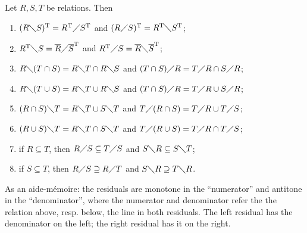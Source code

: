 \begin{lemma} \label{residuals}
Let $R,S,T$ be relations. Then
\begin{enumerate}
\item $(R\diagdown S)^{\mathrm{T}} = R^{\mathrm{T}}\diagup S^{\mathrm{T}}$ and $(R\diagup S)^{\mathrm{T}} = R^{\mathrm{T}}\diagdown S^{\mathrm{T}}$;
\item $R^{\mathrm{T}}\diagdown S = \overline{R}\diagup \overline{S}^{\mathrm{T}}$ and $R^{\mathrm{T}}\diagup S = \overline{R}\diagdown \overline{S}^{\mathrm{T}}$;
\item $R \diagdown (T\cap S) = R\diagdown T \cap R\diagdown S$ and $(T\cap S)\diagup R = T\diagup R \cap S\diagup R$;
\item $R \diagdown (T\cup S) = R\diagdown T \cup R\diagdown S$ and $(T\cap S)\diagup R = T\diagup R \cup S\diagup R$;
\item $(R\cap S) \diagdown T = R\diagdown T \cup S\diagdown T$ and $T\diagup (R\cap S) = T\diagup R \cup T\diagup S$;
\item $(R\cup S) \diagdown T = R\diagdown T \cap S\diagdown T$ and $T\diagup (R\cup S) = T\diagup R \cap T\diagup S$;
\item if $R\subseteq T$, then $R\diagup S \subseteq T\diagup S$ and $S\diagdown R \subseteq S\diagdown T$;
\item if $S\subseteq T$, then $R\diagup S \supseteq R\diagup T$ and $S\diagdown R \supseteq T\diagdown R$.
\end{enumerate}
\end{lemma}

As an aide-mémoire: the residuals are monotone in the ``numerator'' and antitone in the ``denominator'', where the numerator and denominator refer the the relation above, resp. below, the line in both residuals. The left residual has the denominator on the left; the right residual has it on the right.

